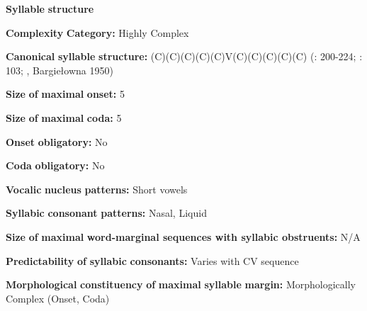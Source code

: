 \documentclass[output=paper]{langsci/langscibook}
\begin{document}
\begin{styleBody}
\textbf{Syllable} \textbf{structure}
\end{styleBody}

\begin{styleBody}
\textbf{Complexity} \textbf{Category:} Highly Complex
\end{styleBody}

\begin{styleBody}
\textbf{Canonical} \textbf{syllable} \textbf{structure:} (C)(C)(C)(C)(C)V(C)(C)(C)(C)(C) (\citealt{Gussman2007}: 200-224; \citealt{Jassem2003}: 103; \citealt{Zydorowicz2010}, Bargiełowna 1950)
\end{styleBody}

\begin{styleBody}
\textbf{Size} \textbf{of} \textbf{maximal} \textbf{onset:} 5
\end{styleBody}

\begin{styleBody}
\textbf{Size} \textbf{of} \textbf{maximal} \textbf{coda:} 5
\end{styleBody}

\begin{styleBody}
\textbf{Onset} \textbf{obligatory:} No
\end{styleBody}

\begin{styleBody}
\textbf{Coda} \textbf{obligatory:} No
\end{styleBody}

\begin{styleBody}
\textbf{Vocalic} \textbf{nucleus} \textbf{patterns:} Short vowels
\end{styleBody}

\begin{styleBody}
\textbf{Syllabic} \textbf{consonant} \textbf{patterns:} Nasal, Liquid
\end{styleBody}

\begin{styleBody}
\textbf{Size} \textbf{of} \textbf{maximal} \textbf{word{}-marginal sequences with syllabic obstruents:} N/A
\end{styleBody}

\begin{styleBody}
\textbf{Predictability} \textbf{of} \textbf{syllabic} \textbf{consonants:} Varies with CV sequence
\end{styleBody}

\begin{styleBody}
\textbf{Morphological} \textbf{constituency} \textbf{of} \textbf{maximal} \textbf{syllable} \textbf{margin:} Morphologically Complex (Onset, Coda)
\end{styleBody}
\end{document}
